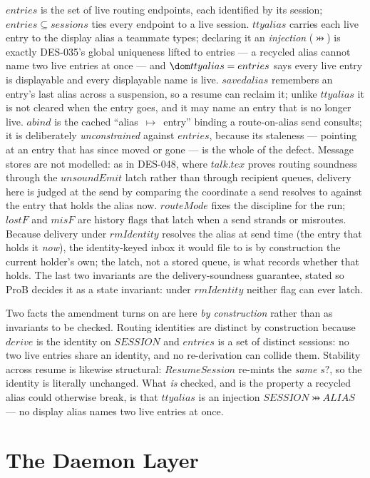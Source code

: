 \documentclass[a4paper,10pt,fleqn]{article}
\begin{document}
$entries$ is the set of live routing endpoints, each identified by its
session; $entries \subseteq sessions$ ties every endpoint to a live
session.  $ttyalias$ carries each live entry to the display alias a
teammate types; declaring it an \emph{injection} ($\pinj$) is exactly
DES-035's global uniqueness lifted to entries --- a recycled alias
cannot name two live entries at once --- and $\dom ttyalias = entries$
says every live entry is displayable and every displayable name is live.
$savedalias$ remembers an entry's last alias across a suspension, so a
resume can reclaim it; unlike $ttyalias$ it is not cleared when the entry
goes, and it may name an entry that is no longer live.  $abind$ is the
cached ``alias~$\mapsto$~entry'' binding a route-on-alias send consults;
it is deliberately \emph{unconstrained} against $entries$, because its
staleness --- pointing at an entry that has since moved or gone --- is
the whole of the defect.  Message stores are not modelled: as in DES-048,
where $talk.tex$ proves routing soundness through the $unsoundEmit$ latch
rather than through recipient queues, delivery here is judged at the send
by comparing the coordinate a send resolves to against the entry that
holds the alias now.  $routeMode$ fixes the discipline for the run;
$lostF$ and $misF$ are history flags that latch when a send strands or
misroutes.  Because delivery under $rmIdentity$ resolves the alias at
send time (the entry that holds it \emph{now}), the identity-keyed inbox
it would file to is by construction the current holder's own; the latch,
not a stored queue, is what records whether that holds.  The last two
invariants are the delivery-soundness guarantee, stated so ProB decides
it as a state invariant: under $rmIdentity$ neither flag can ever latch.

Two facts the amendment turns on are here \emph{by construction} rather
than as invariants to be checked.  Routing identities are distinct by
construction because $derive$ is the identity on $SESSION$ and $entries$
is a set of distinct sessions: no two live entries share an identity, and
no re-derivation can collide them.  Stability across resume is likewise
structural: $ResumeSession$ re-mints the \emph{same} $s?$, so the identity
is literally unchanged.  What \emph{is} checked, and is the property a
recycled alias could otherwise break, is that $ttyalias$ is an injection
$SESSION \pinj ALIAS$ --- no display alias names two live entries at
once.

\section{The Daemon Layer}
\label{sec:daemon}
\end{document}
